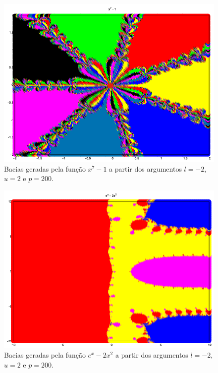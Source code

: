 \documentclass[11pt,reqno,a4paper]{amsart}
\begin{document}
\begin{figure}[p]
    \centering
    \includegraphics[width=15cm]{function_5.png}
    \caption{Bacias geradas pela função $x^7 - 1$ a partir dos argumentos $l = -2$, $u = 2$ e $p = 200$.}
    \label{fig:function_5}
\end{figure}

\begin{figure}[p]
    \centering
    \includegraphics[width=15cm]{function_6.png}
    \caption{Bacias geradas pela função $e^x - 2x^2$ a partir dos argumentos $l = -2$, $u = 2$ e $p = 200$.}
    \label{fig:function6}
\end{figure}


\endgroup
\end{document}
